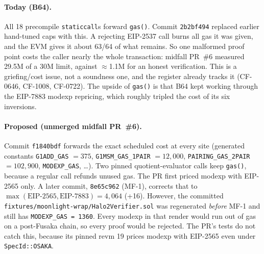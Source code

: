 \paragraph{Today (B64).} All 18 precompile \texttt{staticcall}s forward
\texttt{gas()}. Commit \texttt{2b2bf494} replaced earlier hand-tuned caps
with this. A rejecting EIP-2537 call burns all gas it was given, and the
EVM gives it about 63/64 of what remains. So one malformed proof point
costs the caller nearly the whole transaction: midfall PR~\#6 measured
29.5M of a 30M limit, against $\approx$1.1M for an honest verification.
This is a griefing/cost issue, not a soundness one, and the register
already tracks it (CF-0646, CF-1008, CF-0722). The upside of
\texttt{gas()} is that B64 kept working through the EIP-7883 modexp
repricing, which roughly tripled the cost of its six inversions.

\paragraph{Proposed (unmerged midfall PR~\#6).} Commit \texttt{f1840bdf}
forwards the exact scheduled cost at every site (generated constants
\texttt{G1ADD\_GAS} $=375$, \texttt{G1MSM\_GAS\_1PAIR} $=12{,}000$,
\texttt{PAIRING\_\allowbreak{}GAS\_\allowbreak{}2PAIR} $=102{,}900$, \texttt{MODEXP\_GAS},
\ldots). Two pinned quotient-evaluator calls keep \texttt{gas()}, because
a regular call refunds unused gas. The PR first priced modexp with
EIP-2565 only. A later commit, \texttt{8e65c962} (MF-1), corrects that to
$\max(\text{EIP-2565}, \text{EIP-7883}) = 4{,}064$ (+16). However, the
committed \texttt{fixtures/\allowbreak{}moonlight-wrap/\allowbreak{}Halo2Verifier.sol}
was regenerated \emph{before} MF-1 and still has \texttt{MODEXP\_\allowbreak{}GAS =
1360}. Every modexp in that render would run out of gas on a post-Fusaka
chain, so every proof would be rejected. The PR's tests do not catch
this, because its pinned revm 19 prices modexp with EIP-2565 even under
\texttt{SpecId::OSAKA}.

